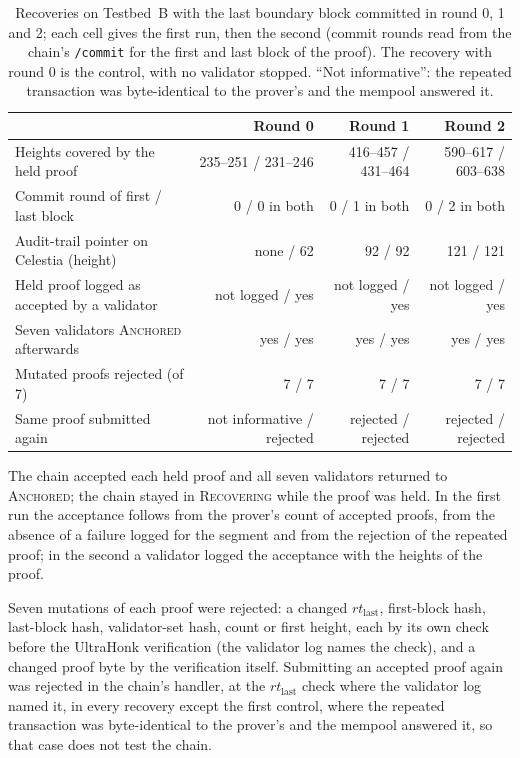 \begin{table}[tbp]
\caption{Recoveries on Testbed~B with the last boundary block committed in round 0, 1 and 2; each cell gives the first run, then the second (commit rounds read from the chain's \texttt{/commit} for the first and last block of the proof). The recovery with round 0 is the control, with no validator stopped. ``Not informative'': the repeated transaction was byte-identical to the prover's and the mempool answered it.}
\label{tab:round-recovery}
\centering
\footnotesize
\begin{tabular}{@{}lrrr@{}}
\toprule
 & \textbf{Round 0} & \textbf{Round 1} & \textbf{Round 2} \\
\midrule
Heights covered by the held proof & 235--251 / 231--246 & 416--457 / 431--464 & 590--617 / 603--638 \\
Commit round of first / last block & 0 / 0 in both & 0 / 1 in both & 0 / 2 in both \\
Audit-trail pointer on Celestia (height) & none / 62 & 92 / 92 & 121 / 121 \\
Held proof logged as accepted by a validator & not logged / yes & not logged / yes & not logged / yes \\
Seven validators \textsc{Anchored} afterwards & yes / yes & yes / yes & yes / yes \\
Mutated proofs rejected (of 7) & 7 / 7 & 7 / 7 & 7 / 7 \\
Same proof submitted again & not informative / rejected & rejected / rejected & rejected / rejected \\
\bottomrule
\end{tabular}
\end{table}

The chain accepted each held proof and all seven validators returned to \textsc{Anchored}; the chain stayed in \textsc{Recovering} while the proof was held. In the first run the acceptance follows from the prover's count of accepted proofs, from the absence of a failure logged for the segment and from the rejection of the repeated proof; in the second a validator logged the acceptance with the heights of the proof.

Seven mutations of each proof were rejected: a changed $rt_{\text{last}}$, first-block hash, last-block hash, validator-set hash, count or first height, each by its own check before the UltraHonk verification (the validator log names the check), and a changed proof byte by the verification itself. Submitting an accepted proof again was rejected in the chain's handler, at the $rt_{\text{last}}$ check where the validator log named it, in every recovery except the first control, where the repeated transaction was byte-identical to the prover's and the mempool answered it, so that case does not test the chain.

